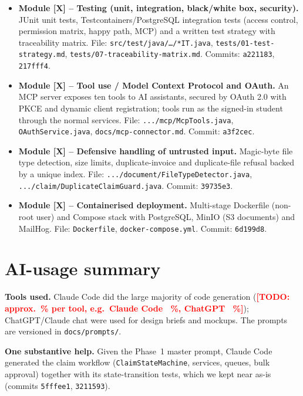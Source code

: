 \documentclass[11pt,a4paper]{article}
\newcommand{\todo}[1]{\textcolor{red}{\textbf{[TODO: #1]}}}
\begin{document}
\begin{itemize}[leftmargin=*,nosep]
    \item \textbf{Module [X] -- Testing (unit, integration, black/white box, security).}
    JUnit unit tests, Testcontainers/PostgreSQL integration tests (access control, permission matrix, happy path, MCP) and a written test strategy with traceability matrix.
    File: \texttt{src/test/java/\ldots/*IT.java}, \texttt{tests/01-test-strategy.md}, \texttt{tests/07-traceability-matrix.md}.
    Commits: \texttt{a221183}, \texttt{217fff4}.

    \item \textbf{Module [X] -- Tool use / Model Context Protocol and OAuth.}
    An MCP server exposes ten tools to AI assistants, secured by OAuth 2.0 with PKCE and dynamic client registration; tools run as the signed-in student through the normal services.
    File: \texttt{.../mcp/McpTools.java}, \texttt{OAuthService.java}, \texttt{docs/mcp-connector.md}.
    Commit: \texttt{a3f2cec}.

    \item \textbf{Module [X] -- Defensive handling of untrusted input.}
    Magic-byte file type detection, size limits, duplicate-invoice and duplicate-file refusal backed by a unique index.
    File: \texttt{.../document/FileTypeDetector.java}, \texttt{.../claim/DuplicateClaimGuard.java}.
    Commit: \texttt{39735e3}.

    \item \textbf{Module [X] -- Containerised deployment.}
    Multi-stage Dockerfile (non-root user) and Compose stack with PostgreSQL, MinIO (S3 documents) and MailHog.
    File: \texttt{Dockerfile}, \texttt{docker-compose.yml}.
    Commit: \texttt{6d199d8}.
\end{itemize}

\section{AI-usage summary}

\textbf{Tools used.}
Claude Code did the large majority of code generation (\todo{approx.\ \% per tool, e.g.\ Claude Code ~\%, ChatGPT ~\%}); ChatGPT/Claude chat were used for design briefs and mockups. The prompts are versioned in \texttt{docs/prompts/}.

\textbf{One substantive help.}
Given the Phase~1 master prompt, Claude Code generated the claim workflow (\texttt{ClaimStateMachine}, services, queues, bulk approval) together with its state-transition tests, which we kept near as-is (commits \texttt{5fffee1}, \texttt{3211593}).
\end{document}
